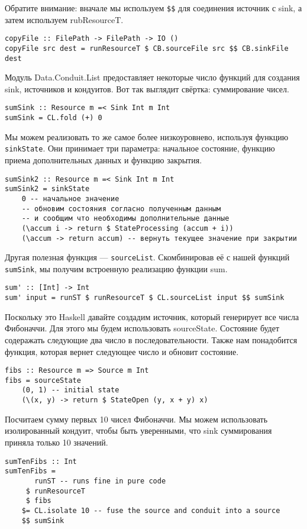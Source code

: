 Обратите внимание: вначале мы используем \verb=$$= для соединения источник с sink, а
затем используем rubResourceT.
\begin{lstlisting}
copyFile :: FilePath -> FilePath -> IO ()
copyFile src dest = runResourceT $ CB.sourceFile src $$ CB.sinkFile dest
\end{lstlisting}
Модуль Data.Conduit.List предоставляет некоторые число функций для создания sink,
источников и кондуитов. Вот так выглядит свёртка: суммирование чисел.
\begin{lstlisting}
sumSink :: Resource m =< Sink Int m Int
sumSink = CL.fold (+) 0
\end{lstlisting}
Мы можем реализовать то же самое более низкоуровнево, используя функцию \verb=sinkState=.
Они принимает три параметра: начальное состояние, функцию приема дополнительных данных и
функцию закрытия.
\begin{lstlisting}
sumSink2 :: Resource m =< Sink Int m Int
sumSink2 = sinkState
    0 -- начальное значение
    -- обновим состояния согласно полученным данным 
    -- и сообщим что необходимы дополнительные данные
    (\accum i -> return $ StateProcessing (accum + i))
    (\accum -> return accum) -- вернуть текущее значение при закрытии
\end{lstlisting}
Другая полезная функция --- \verb=sourceList=. Скомбинировав её с нашей функций
\verb=sumSink=, мы получим встроенную реализацию функции sum.
\begin{lstlisting}
sum' :: [Int] -> Int
sum' input = runST $ runResourceT $ CL.sourceList input $$ sumSink
\end{lstlisting}
Поскольку это Haskell давайте создадим источник, который генерирует все числа Фибоначчи.
Для этого мы будем использовать sourceState. Состояние будет содеражать следующие два
число в последовательности. Также нам понадобится функция, которая вернет следующее число
и обновит состояние.
\begin{lstlisting}fibs :: Resource m => Source m Int
fibs = sourceState
    (0, 1) -- initial state
    (\(x, y) -> return $ StateOpen (y, x + y) x)
\end{lstlisting}
Посчитаем сумму первых 10 чисел Фибоначчи. Мы можем использовать изолированный кондуит,
чтобы быть уверенными, что sink суммирования приняла только 10 значений.
\begin{lstlisting}sumTenFibs :: Int
sumTenFibs =
       runST -- runs fine in pure code
     $ runResourceT
     $ fibs
    $= CL.isolate 10 -- fuse the source and conduit into a source
    $$ sumSink
\end{lstlisting}
